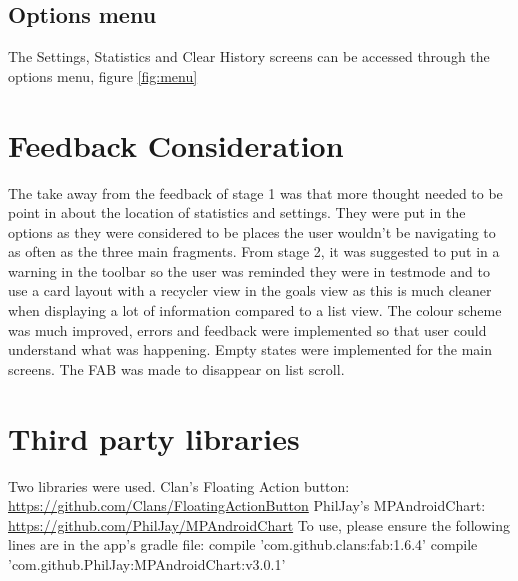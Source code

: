 \documentclass[12pt]{report}
\begin{document}
\subsection{Options menu}

The Settings, Statistics and Clear History screens can be accessed through the options menu, figure \ref{fig:menu}

\section{Feedback Consideration}

The take away from the feedback of stage 1 was that more thought needed to be point in about the location of statistics and settings. They were put in the options as they were considered to be places the user wouldn't be navigating to as often as the three main fragments. 
From stage 2, it was suggested to put in a warning in the toolbar so the user was reminded they were in testmode and to use a card layout with a recycler view in the goals view as this is much cleaner when displaying a lot of information compared to a list view. The colour scheme was much improved, errors and feedback were implemented so that user could understand what was happening. Empty states were implemented for the main screens. The FAB was made to disappear on list scroll. 

\section{Third party libraries}

Two libraries were used.
\newline
Clan's Floating Action button: 
\url{https://github.com/Clans/FloatingActionButton}
\newline
PhilJay's MPAndroidChart: 
\url{https://github.com/PhilJay/MPAndroidChart}
\newline
\newline
To use, please ensure the following lines are in the app's gradle file:
\newline
    compile 'com.github.clans:fab:1.6.4'
    \newline
    compile 'com.github.PhilJay:MPAndroidChart:v3.0.1'
\end{document}
